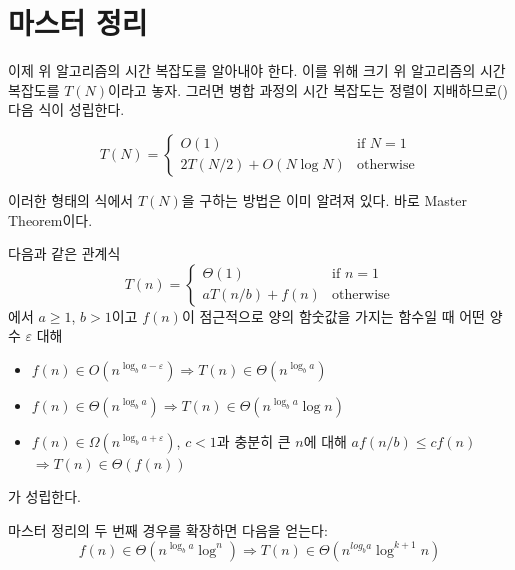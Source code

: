 \section{마스터 정리}
이제 위 알고리즘의 시간 복잡도를 알아내야 한다. 이를 위해 크기 위 알고리즘의 시간복잡도를 $T(N)$이라고 놓자. 그러면 병합 과정의 시간 복잡도는 정렬이 지배하므로() 다음 식이 성립한다.

\begin{equation*}
    T(N) = \begin{cases} 
        O(1) & \textrm{if } N=1 \\ 
        2T(N/2) + O(N \log N) & \textrm{otherwise} 
     \end{cases}
\end{equation*}

이러한 형태의 식에서 $T(N)$을 구하는 방법은 이미 알려져 있다. 바로 Master Theorem이다.


\begin{thm}
    다음과 같은 관계식
    \begin{equation*}
        T(n) = \begin{cases} 
            \Theta(1) & \textrm{if } n=1 \\ 
            aT(n/b) + f(n) & \textrm{otherwise} 
         \end{cases}
    \end{equation*}
    에서 $a \geq 1$, $b > 1$이고 $f(n)$이 점근적으로 양의 함숫값을 가지는 함수일 때 어떤 양수 $\varepsilon$ 대해
    \begin{itemize}
        \item $f(n) \in O(n^{\log_b a - \varepsilon}) \Longrightarrow T(n) \in \Theta(n^{\log_b a})$
        \item $f(n) \in \Theta(n^{\log_b a}) \Longrightarrow T(n) \in \Theta(n^{\log_b a} \log n)$
        \item $f(n) \in \Omega(n^{\log_b a + \varepsilon})$, $c<1$과 충분히 큰 $n$에 대해 $af(n/b) \leq cf(n)$ $\Longrightarrow T(n) \in \Theta(f(n))$
    \end{itemize}
    가 성립한다.
\end{thm}

\begin{remark}
    마스터 정리의 두 번째 경우를 확장하면 다음을 얻는다:
    \begin{equation*}
        f(n) \in \Theta(n^{\log_b a} \log^ n) \Longrightarrow T(n) \in \Theta(n^{log_b a} \log^{k+1} n)
    \end{equation*}
\end{remark}

